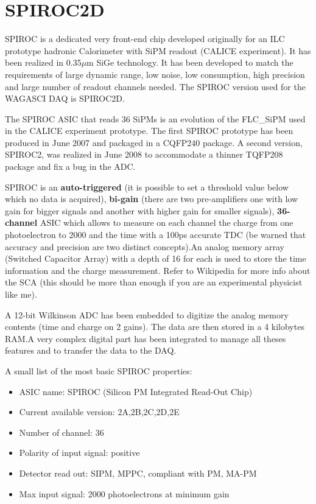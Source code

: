 \section{SPIROC2D}
SPIROC is a dedicated very front-end chip developed originally for an
ILC prototype hadronic Calorimeter with SiPM readout (CALICE
experiment). It has been realized in 0.35$\mu$m SiGe technology. It
has been developed to match the requirements of large dynamic range,
low noise, low consumption, high precision and large number of readout
channels needed. The SPIROC version used for the WAGASCI DAQ is
SPIROC2D.

The SPIROC ASIC that reads 36 SiPMs is an evolution of the FLC\_SiPM
used in the CALICE experiment prototype. The first SPIROC prototype has been
produced in June 2007 and packaged in a CQFP240 package. A second
version, SPIROC2, was realized in June 2008 to accommodate a thinner
TQFP208 package and fix a bug in the ADC.

SPIROC is an \textbf{auto-triggered} (it is possible to set a
threshold value below which no data is acquired), \textbf{bi-gain}
(there are two pre-amplifiers one with low gain for bigger signals and
another with higher gain for smaller signals), \textbf{36-channel}
ASIC which allows to measure on each channel the charge from one
photoelectron to 2000 and the time with a 100ps accurate TDC (be
warned that accuracy and precision are two distinct concepts).\@ An
analog memory array (Switched Capacitor Array) with a depth of 16 for
each is used to store the time information and the charge
measurement. Refer to Wikipedia for more info about the SCA (this
should be more than enough if you are an experimental physicist like
me).

A 12-bit Wilkinson ADC has been embedded to digitize the analog memory
contents (time and charge on 2 gains). The data are then stored in a 4
kilobytes RAM.\@ A very complex digital part has been integrated to
manage all theses features and to transfer the data to the DAQ.\@

A small list of the most basic SPIROC properties:
\begin{itemize}
\item ASIC name: SPIROC (Silicon PM Integrated Read-Out Chip)
\item Current available version: 2A,2B,2C,2D,2E
\item Number of channel: 36
\item Polarity of input signal: positive
\item Detector read out: SIPM, MPPC, compliant with PM, MA-PM
\item Max input signal: 2000 photoelectrons at minimum gain
\end{itemize}

